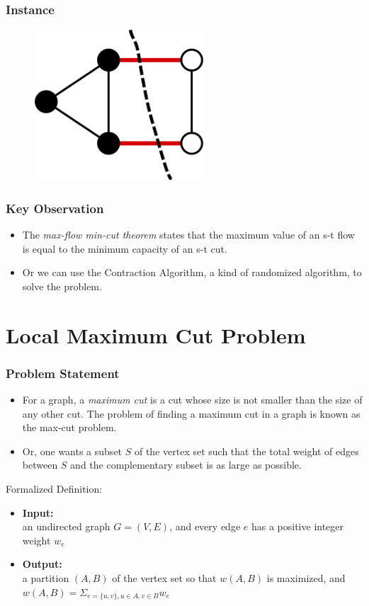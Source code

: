 \documentclass[slidestop,compress,mathserif]{beamer}
\begin{document}
\frame
{
\frametitle{Instance}
\begin{figure}
	\includegraphics[width=2.5in]{1000px-Min-cut.svg.eps}
\end{figure}
}

\frame
{
\frametitle{Key Observation}
\begin{itemize}
	\item The \emph{max-flow min-cut theorem} states that the maximum value of an s-t flow is equal to the minimum capacity of an s-t cut.
	\item Or we can use the Contraction Algorithm, a kind of randomized algorithm, to solve the problem.
\end{itemize}
}

\section{Local Maximum Cut Problem}
\frame
{
\frametitle{Problem Statement}
\begin{itemize}
	\item For a graph, a \emph{maximum cut} is a cut whose size is not smaller than the size of any other cut. The problem of finding a maximum cut in a graph is known as the max-cut problem.
	\item Or, one wants a subset $S$ of the vertex set such that the total weight of edges between $S$ and the complementary subset is as large as possible.
\end{itemize}
\begin{block}{Formalized Definition:}
	\begin{itemize}
		\item {\bf Input:} \\an undirected graph $G=(V,E)$, and every edge $e$ has a positive integer weight $w_e$
		\item {\bf Output:}\\a partition $(A,B)$ of the vertex set so that $w(A,B)$ is maximized, and $w(A,B)=\Sigma_{e=\{ u,v\} ,u\in A,v\in B} w_e$
	\end{itemize}
\end{block}
}
\end{document}
